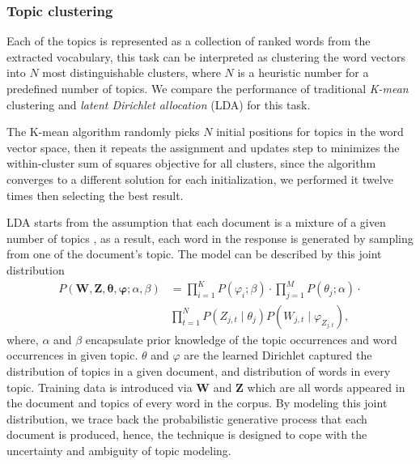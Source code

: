 \documentclass[10pt,journal,compsoc]{IEEEtran}
\begin{document}
\subsubsection{Topic clustering}
Each of the topics is represented as a collection of ranked words from the extracted vocabulary, this task can be interpreted as clustering the word vectors into $N$ most distinguishable clusters, where $N$ is a heuristic number for a predefined number of topics. We compare the performance of traditional \textit{K-mean} clustering and \textit{latent Dirichlet allocation} (LDA)
for this task.

The K-mean algorithm randomly picks $N$ initial positions for topics in the word vector space, then it repeats the assignment and updates step to minimizes the within-cluster sum of squares objective for all clusters, since the algorithm converges to a different solution for each initialization, we performed it twelve times then selecting the best result.

LDA starts from the assumption that each document is a mixture of a given number of topics
, as a result, each word in the response is generated by sampling from one of the document's topic. The model can be described by this joint distribution
\begin{equation}
\begin{aligned}
P({\boldsymbol{W}},{\boldsymbol{Z}},{\boldsymbol{\theta }},{\boldsymbol{\varphi}};\alpha ,\beta ) &= \prod _{i=1}^{K}P(\varphi _{i};\beta ) \cdot \prod _{j=1}^{M}P(\theta _{j};\alpha ) \cdot \\
    & \prod _{t=1}^{N}P(Z_{j,t}\mid \theta _{j})P(W_{j,t}\mid \varphi _{Z_{j,t}}),
\end{aligned}
\end{equation}
where, $\alpha$ and $\beta$ encapsulate prior knowledge of the topic occurrences and word occurrences in given topic. $\theta$ and $\varphi$ are the learned Dirichlet captured the distribution of topics in a given document, and distribution of words in every topic. Training data is introduced via $\boldsymbol{W}$ and $\boldsymbol{Z}$ which are all words appeared in the document and topics of every word in the corpus. By modeling this joint distribution, we trace back the probabilistic generative process that each document is produced, hence, the technique is designed to cope with the uncertainty and ambiguity of topic modeling.
\end{document}
